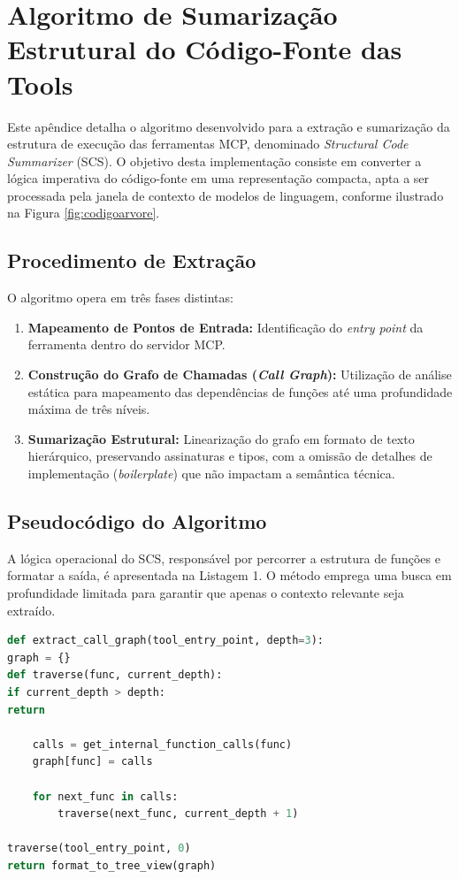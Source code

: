 \section{Algoritmo de Sumarização Estrutural do Código-Fonte das Tools}
\label{apendice:secao}

Este apêndice detalha o algoritmo desenvolvido para a extração e sumarização da estrutura de execução das ferramentas MCP, denominado \textit{Structural Code Summarizer} (SCS). O objetivo desta implementação consiste em converter a lógica imperativa do código-fonte em uma representação compacta, apta a ser processada pela janela de contexto de modelos de linguagem, conforme ilustrado na Figura \ref{fig:codigoarvore}.

\subsection*{Procedimento de Extração}
O algoritmo opera em três fases distintas:
\begin{enumerate}
    \item \textbf{Mapeamento de Pontos de Entrada:} Identificação do \textit{entry point} da ferramenta dentro do servidor MCP.
    \item \textbf{Construção do Grafo de Chamadas (\textit{Call Graph}):} Utilização de análise estática para mapeamento das dependências de funções até uma profundidade máxima de três níveis.
    \item \textbf{Sumarização Estrutural:} Linearização do grafo em formato de texto hierárquico, preservando assinaturas e tipos, com a omissão de detalhes de implementação (\textit{boilerplate}) que não impactam a semântica técnica.
\end{enumerate}

\subsection*{Pseudocódigo do Algoritmo}
A lógica operacional do SCS, responsável por percorrer a estrutura de funções e formatar a saída, é apresentada na Listagem 1. O método emprega uma busca em profundidade limitada para garantir que apenas o contexto relevante seja extraído.

\begin{lstlisting}[language=Python, caption=Lógica do algoritmo SCS, label=code:scs]
def extract_call_graph(tool_entry_point, depth=3):
graph = {}
def traverse(func, current_depth):
if current_depth > depth:
return

    calls = get_internal_function_calls(func)
    graph[func] = calls

    for next_func in calls:
        traverse(next_func, current_depth + 1)

traverse(tool_entry_point, 0)
return format_to_tree_view(graph)

\end{lstlisting}

